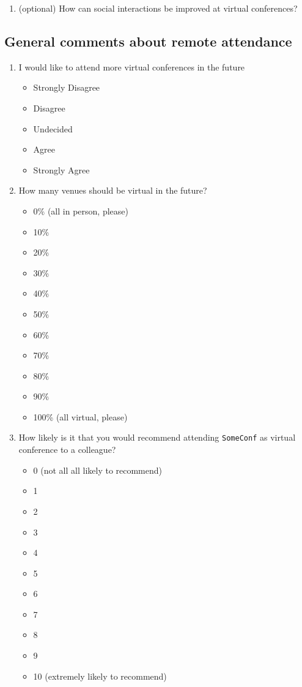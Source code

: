 \documentclass[sigconf]{acmart}
\newcommand{\confname}[0]{\texttt{SomeConf}\xspace}
\newcommand{\QO}{$\Box$}%
\newenvironment{Qlist}{%
\renewcommand{\labelitemi}{\QO}
\begin{itemize}[leftmargin=1.5em,topsep=-.5em]
}{%
\end{itemize}
}
\newcommand{\Qline}[1]{\noindent\rule{#1}{0.6pt}}
\newcounter{ql}
\newcommand{\Qlines}[1]{\forloop{ql}{0}{\value{ql}<#1}{\vskip0em\Qline{\linewidth}}}
\begin{document}
\begin{appendix}
\begin{enumerate}
	\item (optional) How can social interactions be improved at virtual conferences?
		\Qlines{3}

\setcounter{postConfCounter}{\value{enumi}}
\end{enumerate}


\subsection{General comments about remote attendance}

\begin{enumerate}
\setcounter{enumi}{\value{postConfCounter}}

	\item I would like to attend more virtual conferences in the future
		\begin{Qlist}
			\item Strongly Disagree
			\item Disagree
			\item Undecided
			\item Agree
			\item Strongly Agree
		\end{Qlist}

	\item How many venues should be virtual in the future?
		\begin{Qlist}
			\item 0\% (all in person, please)
			\item 10\%
			\item 20\%
			\item 30\%
			\item 40\%
			\item 50\%
			\item 60\%
			\item 70\%
			\item 80\%
			\item 90\%
			\item 100\% (all virtual, please)
		\end{Qlist}

	\item How likely is it that you would recommend attending \confname as virtual conference to a colleague?
		\begin{Qlist}
			\item 0 (not all all likely to recommend)
			\item 1
			\item 2
			\item 3
			\item 4
			\item 5
			\item 6
			\item 7
			\item 8
			\item 9
			\item 10 (extremely likely to recommend)
		\end{Qlist}


\end{enumerate}
\end{appendix}
\end{document}
